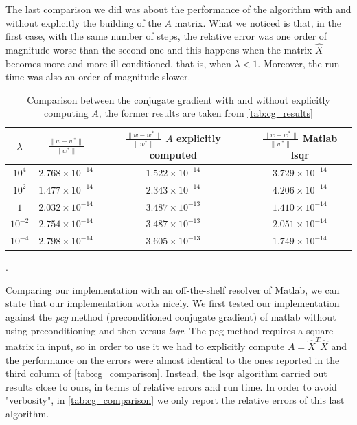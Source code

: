 \noindent The last comparison we did was about the performance of the algorithm with and without explicitly the building of the $A$ matrix. What we noticed is that, in the first case, with the same number of steps, the relative error was one order of magnitude worse than the second one and this happens when the matrix $\hat{X}$ becomes more and more ill-conditioned, that is, when $\lambda < 1$. Moreover, the run time was also an order of magnitude slower.

\begin{table}[H]
\centering
\begin{tabular}{c|c|c|c} \hline \hline
    $\lambda$ & $\frac{\lVert w - w^{*} \lVert}{\rVert w^{*} \lVert}$& $\frac{\lVert w - w^{*} \lVert}{\rVert w^{*} \lVert}$ $A$ explicitly computed & $\frac{\lVert w - w^{*} \lVert}{\rVert w^{*} \lVert}$ Matlab lsqr\\ \hline \hline
    
    \rowcolor{gray!30} $10^4$ & $2.768 \times 10^{-14}$ & $ 1.522 \times 10^{-14}$ & $3.729 \times 10^{-14}$\\
    
    $10^2$ & $ 1.477 \times 10^{-14}$ & $ 2.343 \times 10^{-14}$& $4.206 \times 10^{-14}$\\
    
    \rowcolor{gray!30} $1$ & $2.032\times 10^{-14} $ & $ 3.487 \times 10^{-13} $ & $1.410 \times 10^{-14}$\\
    
    $10^{-2}$ & $2.754 \times 10^{-14}$ & $3.487 \times 10^{-13}$ & $2.051 \times 10^{-14}$\\
    
    \rowcolor{gray!30} $10^{-4}$ & $2.798 \times 10^{-14} $ & $3.605 \times 10^{-13} $ & $1.749 \times 10^{-14}$\\
    \hline \hline
\end{tabular}
\caption{Comparison between the conjugate gradient with and without explicitly computing $A$, the former results are taken from \autoref{tab:cg_results}}.
\label{tab:cg_comparison}
\end{table}

\noindent Comparing our implementation with an off-the-shelf resolver of Matlab, we can state that our implementation works nicely. We first tested our implementation against the \textit{pcg} method (preconditioned conjugate gradient) of matlab without using preconditioning and then versus \textit{lsqr}. The pcg method requires a square matrix in input, so in order to use it we had to explicitly compute $A = \hat{X}^{T} \hat{X}$ and the performance on the errors were almost identical to the ones reported in the third column of \autoref{tab:cg_comparison}. Instead, the lsqr algorithm carried out results close to ours, in terms of relative errors and run time. In order to avoid "verbosity", in \autoref{tab:cg_comparison} we only report the relative errors of this last algorithm.
